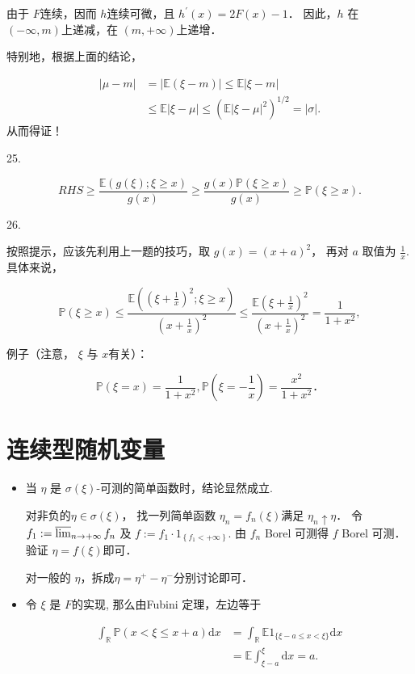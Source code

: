 由于 $F$连续，因而  $h  $连续可微，且  $h^{\prime}(x)=2 F(x)-1$．
因此，$h$ 在  $(-\infty, m)$上递减，在  $(m,+\infty)  $上递增．

特别地，根据上面的结论，

\begin{align}
|\mu-m| & =|\mathbb{E}(\xi-m)| \leq \mathbb{E}|\xi-m| \\
& \leq \mathbb{E}|\xi-\mu| \leq\left(\mathbb{E}|\xi-\mu|^{2}\right)^{1 / 2}=|\sigma| .
\end{align}
从而得证！

25.

$$RHS \geq \frac{\mathbb{E}(g(\xi) ; \xi \geq x)}{g(x)} \geq \frac{g(x) \mathbb{P}(\xi \geq x)}{g(x)} \geq \mathbb{P}(\xi \geq x).$$

26.

按照提示，应该先利用上一题的技巧，取  $g(x)=(x+a)^{2}$， 再对  $a$  取值为  $\frac1x$.
具体来说，

$$\mathbb{P}(\xi \geq x) \leq \frac{\mathbb{E}\left(\left(\xi+\frac{1}{x}\right)^{2} ; \xi \geq x\right)}{\left(x+\frac{1}{x}\right)^{2}} \leq \frac{\mathbb{E}\left(\xi+\frac{1}{x}\right)^{2}}{\left(x+\frac{1}{x}\right)^{2}}=\frac{1}{1+x^{2}},$$

例子（注意， $\xi$  与  $x$有关）：  

$$\mathbb{P}(\xi=x)=\frac{1}{1+x^{2}}, \mathbb{P}\left(\xi=-\frac{1}{x}\right)=\frac{x^{2}}{1+x^{2}}．$$

\section{连续型随机变量}
\begin{itemize}
\item[5.]

当  $\eta $ 是  $\sigma(\xi) $-可测的简单函数时，结论显然成立. 

对非负的$\eta \in \sigma(\xi)$，
找一列简单函数  $\eta_{n}=f_{n}(\xi)  $满足  $\eta_{n} \uparrow \eta$．
令  $f_{1}:=\varlimsup_{n \rightarrow+\infty} f_{n}$
及  $f:=f_{1} \cdot 1_{\left\{f_{1}<+\infty\right\}}$.
由  $f_{n}$  Borel 可测得  $f$ Borel 可测．
验证  $\eta=f(\xi)$即可．

对一般的  $\eta$，拆成$\eta = \eta^+ - \eta^-$分别讨论即可．

\item[21.]

令  $\xi$  是  $F$的实现,
那么由Fubini 定理，左边等于

\begin{align}
\int_{\mathbb{R}} \mathbb{P}(x<\xi \leq x+a) \mathrm{d} x & =\int_{\mathbb{R}} \mathbb{E} 1_{\{\xi-a \leq x<\xi\}} \mathrm{d} x \\
& =\mathbb{E} \int_{\xi-a}^{\xi} \mathrm{d} x=a.
\end{align}
\end{itemize}
